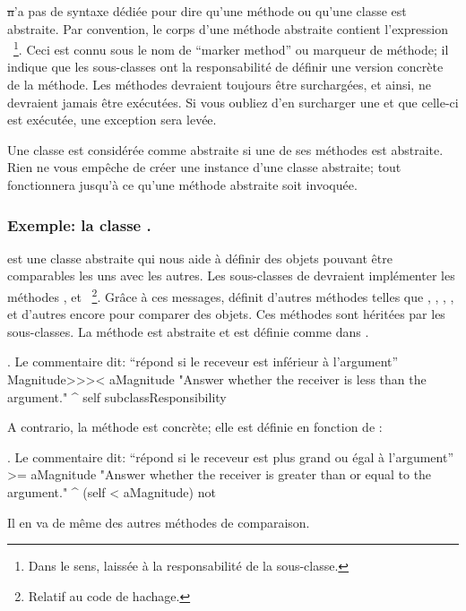 \documentclass[a4paper,10pt,twoside]{book}
\begin{document}
\st n'a pas de syntaxe dédiée pour dire qu'une méthode ou qu'une classe est abstraite. 
Par convention, le corps d'une méthode abstraite contient l'expression ~\footnote{Dans le sens, laissée à la responsabilité de la sous-classe.}. 
Ceci est connu sous le nom de ``marker method'' ou marqueur de méthode; il indique que les sous-classes ont la responsabilité de définir une version concrète de la méthode. 
Les méthodes  devraient toujours être surchargées, et ainsi, ne devraient jamais être exécutées.
Si vous oubliez d'en surcharger une et que celle-ci est exécutée, une exception sera levée. 

Une classe est considérée comme abstraite si une de ses méthodes est abstraite.
Rien ne vous empêche de créer une instance d'une classe abstraite; tout fonctionnera jusqu'à ce qu'une méthode abstraite soit invoquée. 

\subsubsection{Exemple: la classe .}
 est une classe abstraite qui nous aide à définir
des objets pouvant être comparables les uns avec les autres. Les
sous-classes de  devraient implémenter les méthodes
\ct{<}, \ct{=} et ~\footnote{Relatif au code de hachage.}.
Grâce à ces messages,  définit d'autres méthodes telles que
\ct{>}, \ct{>=}, \ct{<=}, ,   et
d'autres encore pour comparer des objets.
Ces méthodes sont héritées par les sous-classes.
La méthode  est abstraite et est définie comme
dans .

\begin{method}[MagnitudeLessThan]{. Le commentaire dit: ``répond si le receveur est inférieur à l'argument''}
Magnitude>>>< aMagnitude 
	"Answer whether the receiver is less than the argument."
	^ self subclassResponsibility
\end{method}

\noindent
A contrario, la méthode  est concrète; elle est définie en fonction de \ct{<}:

\begin{method}[Magnitude>=]{. Le commentaire dit: ``répond si le receveur est plus grand ou égal à l'argument''}
>= aMagnitude 
	"Answer whether the receiver is greater than or equal to the argument."
	^ (self < aMagnitude) not
\end{method}
Il en va de même des autres méthodes de comparaison.
\end{document}
